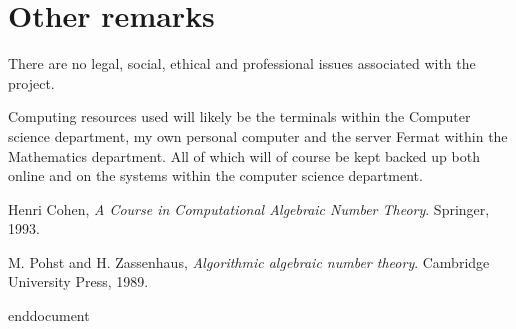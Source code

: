 \documentclass[11pt,a4paper]{article}
\begin{document}
\section*{Other remarks}
There are no legal, social, ethical and professional issues associated with the
project.

Computing resources used will likely be the terminals within the 
Computer science department, my own personal computer and the server Fermat
within the Mathematics department.
All of which will of course be kept backed up both online and on the systems
within the computer science department.


\begin{thebibliography}{Poh-Zas89}
  Henri Cohen, 
  \emph{A Course in Computational Algebraic Number Theory}.
  Springer,
  1993.

  M. Pohst and H. Zassenhaus, 
  \emph{Algorithmic algebraic number theory}.
  Cambridge University Press,
  1989.

\end{thebibliography}

end{document}
\end{document}

